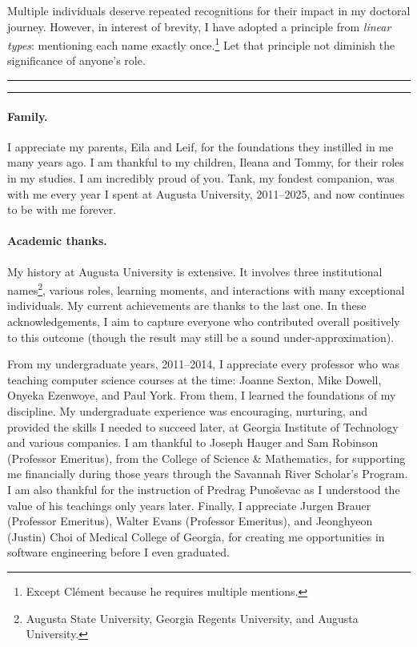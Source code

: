 Multiple individuals deserve repeated recognitions for their impact in my doctoral journey.
However, in interest of brevity, I have adopted a principle from \emph{linear types}: mentioning each name exactly once.\footnote{Except Clément because he requires multiple mentions.}
Let that principle not diminish the significance of anyone's role. %

\noindent\hfil\rule{0.25\textwidth}{.4pt}\hspace{1em}\raisebox{-0.5\height}{\SixFlowerAltPetal}\hspace{1em}\rule{0.25\textwidth}{.4pt}\hfil

\paragraph*{Family.}
I appreciate my parents, Eila and Leif, for the foundations they instilled in me many years ago.
I am thankful to my children, Ileana and Tommy, for their roles in my studies.
I am incredibly proud of you.
Tank, my fondest companion, was with me every year I spent at Augusta University, 2011--2025, and now continues to be with me forever.

\paragraph*{Academic thanks.}
My history at {Augusta University} is extensive.
It involves three institutional names\footnote{Augusta State University, Georgia Regents University, and Augusta University.},
various roles, learning moments, and interactions with many exceptional individuals.
My current achievements are thanks to the last one.
In these acknowledgements, I aim to capture everyone who contributed overall positively to this outcome
(though the result may still be a sound under-approximation).

From my undergraduate years, 2011--2014, I appreciate every professor who was teaching computer science courses at the time: Joanne Sexton, Mike Dowell, Onyeka Ezenwoye, and Paul York.
From them, I learned the foundations of my discipline.
My undergraduate experience was encouraging, nurturing, and provided the skills I needed to succeed later, at Georgia Institute of Technology and various companies.
I am thankful to Joseph Hauger and Sam Robinson (Professor Emeritus), from the College of Science \& Mathematics, for supporting me financially during those years through the Savannah River Scholar's Program.
I am also thankful for the instruction of Predrag Punoševac as I understood the value of his teachings only years later.
Finally, I appreciate Jurgen Brauer (Professor Emeritus), Walter Evans (Professor Emeritus), and Jeonghyeon (Justin) Choi of Medical College of Georgia, for creating me opportunities in software engineering before I even graduated.

